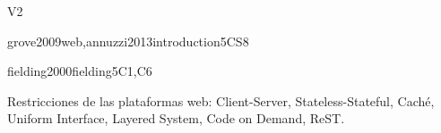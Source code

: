 \begin{syllabus}
\begin{competences}{V2}
    \item {}
    \item {}
    \item {}
\end{competences}

\begin{unit}{\PBDIntroduction}{}{grove2009web,annuzzi2013introduction}{5}{CS8}
\begin{topics}%
    \item \PBDIntroductionTopicOverview
    \item \PBDIntroductionTopicProgramming
    \item \PBDIntroductionTopicOverviewOf
    \item \PBDIntroductionTopicProgrammingUnder
\end{topics}
\begin{learningoutcomes}
    \item \PBDIntroductionLODescribeHowDevelopment [\Familiarity]
    \item \PBDIntroductionLOListCharacteristics [\Familiarity]
    \item \PBDIntroductionLOWriteAnd [\Familiarity]
    \item \PBDIntroductionLOListTheDisadvantages [\Familiarity]
\end{learningoutcomes}
\end{unit}

\begin{unit}{\PBDWebPlatforms}{}{fielding2000fielding}{5}{C1,C6}
\begin{topics}%
    \item \PBDWebPlatformsTopicWeb
    \item Restricciones de las plataformas web: Client-Server, Stateless-Stateful, Caché, Uniform Interface, Layered System, Code on Demand, ReST.
    \item \PBDWebPlatformsTopicWebPlatform
    \item \PBDWebPlatformsTopicSoftware
    \item \PBDWebPlatformsTopicWebStandards
\end{topics}
\begin{learningoutcomes}
    \item \PBDWebPlatformsLODesignAndSimple [\Familiarity]
    \item \PBDWebPlatformsLODescribeTheTheOn [\Familiarity]
    \item \PBDWebPlatformsLOCompareAndProgramming [\Familiarity]
    \item \PBDWebPlatformsLODescribeTheSoftware [\Familiarity]
    \item \PBDWebPlatformsLODiscussHowImpact [\Familiarity]
    \item \PBDWebPlatformsLOReview [\Familiarity]
\end{learningoutcomes}
\end{unit}


\end{syllabus}
